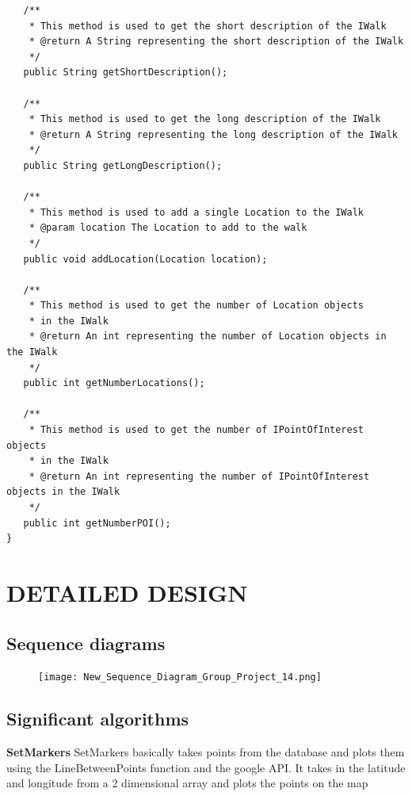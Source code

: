 \documentclass{project}
\begin{document}
\begin{verbatim}
   /**
    * This method is used to get the short description of the IWalk
    * @return A String representing the short description of the IWalk
    */
   public String getShortDescription();
   
   /**
    * This method is used to get the long description of the IWalk
    * @return A String representing the long description of the IWalk
    */
   public String getLongDescription();
   
   /**
    * This method is used to add a single Location to the IWalk
    * @param location The Location to add to the walk
    */
   public void addLocation(Location location);
   
   /**
    * This method is used to get the number of Location objects
    * in the IWalk
    * @return An int representing the number of Location objects in the IWalk
    */
   public int getNumberLocations();
   
   /**
    * This method is used to get the number of IPointOfInterest objects
    * in the IWalk
    * @return An int representing the number of IPointOfInterest objects in the IWalk
    */
   public int getNumberPOI();
}

\end{verbatim}

\newpage

\section{DETAILED DESIGN}
\subsection{Sequence diagrams}

\begin{figure}[h] 

   
\texttt{[image: New\_Sequence\_Diagram\_Group\_Project\_14.png]}
    
\end{figure}

\newpage

\subsection{Significant algorithms}
\textbf{SetMarkers}
SetMarkers basically takes points from the database and plots them using the LineBetweenPoints function and the google API. It takes in the latitude and longitude from a 2 dimensional array and plots the points on the map
\end{document}
